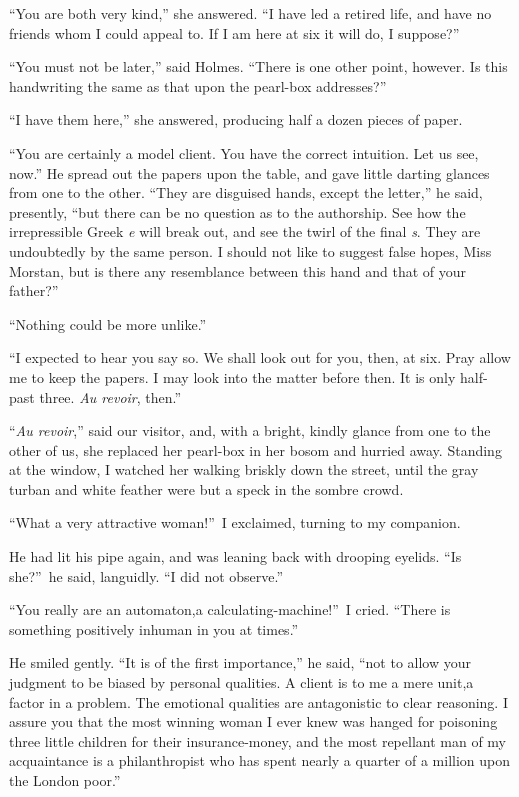 \documentclass[12pt,english,oneside]{book}
\begin{document}
{}``You are both very kind,'' she answered. {}``I have led a retired
life, and have no friends whom I could appeal to. If I am here at
six it will do, I suppose?''

{}``You must not be later,'' said Holmes. {}``There is one other
point, however. Is this handwriting the same as that upon the pearl-box
addresses?''

{}``I have them here,'' she answered, producing half a dozen pieces
of paper.

{}``You are certainly a model client. You have the correct intuition.
Let us see, now.'' He spread out the papers upon the table, and gave
little darting glances from one to the other. {}``They are disguised
hands, except the letter,'' he said, presently, {}``but there can
be no question as to the authorship. See how the irrepressible Greek
\emph{e} will break out, and see the twirl of the final \emph{s}.
They are undoubtedly by the same person. I should not like to suggest
false hopes, Miss Morstan, but is there any resemblance between this
hand and that of your father?''

{}``Nothing could be more unlike.''

{}``I expected to hear you say so. We shall look out for you, then,
at six. Pray allow me to keep the papers. I may look into the matter
before then. It is only half-past three. \emph{Au revoir}, then.''

{}``\emph{Au revoir},'' said our visitor, and, with a bright, kindly
glance from one to the other of us, she replaced her pearl-box in
her bosom and hurried away. Standing at the window, I watched her
walking briskly down the street, until the gray turban and white feather
were but a speck in the sombre crowd.

{}``What a very attractive woman!''\ I exclaimed, turning to my
companion.

He had lit his pipe again, and was leaning back with drooping eyelids.
{}``Is she?''\ he said, languidly. {}``I did not observe.''

{}``You really are an automaton,\mdsh{---}a calculating-machine!''\ I
cried. {}``There is something positively inhuman in you at times.''

He smiled gently. {}``It is of the first importance,'' he said,
{}``not to allow your judgment to be biased by personal qualities.
A client is to me a mere unit,\mdsh{---}a factor in a problem. The
emotional qualities are antagonistic to clear reasoning. I assure
you that the most winning woman I ever knew was hanged for poisoning
three little children for their insurance-money, and the most repellant
man of my acquaintance is a philanthropist who has spent nearly a
quarter of a million upon the London poor.''
\end{document}
